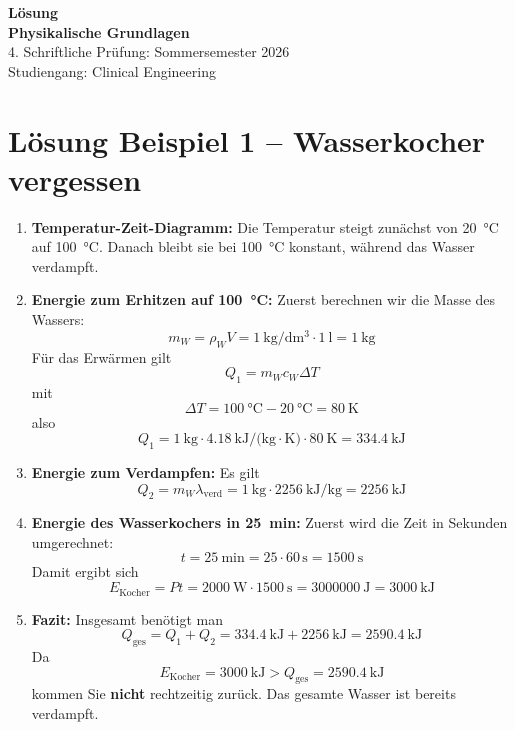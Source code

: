 \documentclass[11pt, a4paper]{article}
\begin{document}
\noindent
\vspace{9cm}
\begin{center}
    {\Huge \textbf{Lösung}} \\[1.5em]
    {\Large \textbf{Physikalische Grundlagen}} \\[1em]
    {\large 4. Schriftliche Prüfung: Sommersemester 2026} \\[1em]
    {\large Studiengang: Clinical Engineering}
\end{center}

\newpage

\section*{Lösung Beispiel 1 -- Wasserkocher vergessen}
\begin{enumerate}
    \item \textbf{Temperatur-Zeit-Diagramm:}
    Die Temperatur steigt zunächst von \SI{20}{\degreeCelsius} auf \SI{100}{\degreeCelsius}. Danach bleibt sie bei \SI{100}{\degreeCelsius} konstant, während das Wasser verdampft.

    \item \textbf{Energie zum Erhitzen auf \SI{100}{\degreeCelsius}:}
    Zuerst berechnen wir die Masse des Wassers:
    \[
        m_W = \rho_W V = \SI{1}{\kilogram\per\deci\metre\cubed} \cdot \SI{1}{\litre} = \SI{1}{\kilogram}
    \]
    Für das Erwärmen gilt
    \[
        Q_1 = m_W c_W \Delta T
    \]
    mit
    \[
        \Delta T = \SI{100}{\degreeCelsius} - \SI{20}{\degreeCelsius} = \SI{80}{\kelvin}
    \]
    also
    \[
        Q_1 = \SI{1}{\kilogram} \cdot \SI{4.18}{\kilo\joule\per(\kilogram\cdot\kelvin)} \cdot \SI{80}{\kelvin} = \SI{334.4}{\kilo\joule}
    \]

    \item \textbf{Energie zum Verdampfen:}
    Es gilt
    \[
        Q_2 = m_W \lambda_{\text{verd}} = \SI{1}{\kilogram} \cdot \SI{2256}{\kilo\joule\per\kilogram} = \SI{2256}{\kilo\joule}
    \]

    \item \textbf{Energie des Wasserkochers in \SI{25}{\minute}:}
    Zuerst wird die Zeit in Sekunden umgerechnet:
    \[
        t = \SI{25}{\minute} = 25 \cdot 60\,\si{\second} = \SI{1500}{\second}
    \]
    Damit ergibt sich
    \[
        E_{\text{Kocher}} = P t = \SI{2000}{\watt} \cdot \SI{1500}{\second} = \SI{3000000}{\joule} = \SI{3000}{\kilo\joule}
    \]

    \item \textbf{Fazit:}
    Insgesamt benötigt man
    \[
        Q_{\text{ges}} = Q_1 + Q_2 = \SI{334.4}{\kilo\joule} + \SI{2256}{\kilo\joule} = \SI{2590.4}{\kilo\joule}
    \]
    Da
    \[
        E_{\text{Kocher}} = \SI{3000}{\kilo\joule} > Q_{\text{ges}} = \SI{2590.4}{\kilo\joule}
    \]
    kommen Sie \textbf{nicht} rechtzeitig zurück. Das gesamte Wasser ist bereits verdampft.
\end{enumerate}
\end{document}

